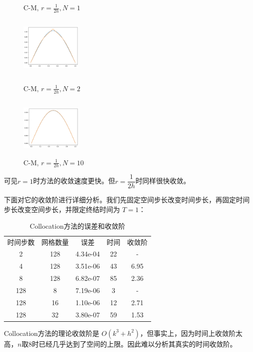 \documentclass{ctexart}
\begin{document}
\begin{figure}[htbp]
\begin{minipage}{5cm}
		\caption{C-M, $r=\frac 1{2h},N=1$}
		\label{CM4}
	\end{minipage}
	\begin{minipage}{5cm}
		\centering
		\includegraphics[width = 3cm, height = 3cm]{2-2-2.png}
		\caption{C-M, $r=\frac 1{2h},N=2$}
		\label{CM5}
	\end{minipage}
	\begin{minipage}{5cm}
		\centering
		\includegraphics[width = 3cm, height = 3cm]{2-2-3.png}
		\caption{C-M, $r=\frac 1{2h},N=10$}
		\label{CM6}
	\end{minipage}
\end{figure}

可见$r=1$时方法的收敛速度更快。但$r=\dfrac 1{2h}$时同样很快收敛。

下面对它的收敛阶进行详细分析。我们先固定空间步长改变时间步长，再固定时间步长改变空间步长，并限定终结时间为 $T=1$：

\begin{table}\centering
	\begin{tabular}{|c|c|c|c|c|}
	\hline
	时间步数 & 网格数量 & 误差 & 时间 & 收敛阶\\ \cline{1-5}
	2 & 128 & 4.34e-04 & 22  & - \\ \cline{1-5}
	4 & 128 & 3.51e-06 & 43 & 6.95 \\ \cline{1-5}
	8 & 128 & 6.82e-07 & 85 & 2.36\\ \cline{1-5}
	128 & 8 & 7.19e-06 & 3 & - \\ \cline{1-5}
	128 & 16 & 1.10e-06 & 12 & 2.71 \\ \cline{1-5}
	128 & 32 & 3.80e-07 & 59 & 1.53 \\ \cline{1-5}
	\end{tabular}
	\caption{Collocation方法的误差和收敛阶}
\end{table}

Collocation方法的理论收敛阶是 $O(k^3+h^2)$，但事实上，因为时间上收敛阶太高，$n$取$8$时已经几乎达到了空间的上限。因此难以分析其真实的时间收敛阶。
\end{document}
